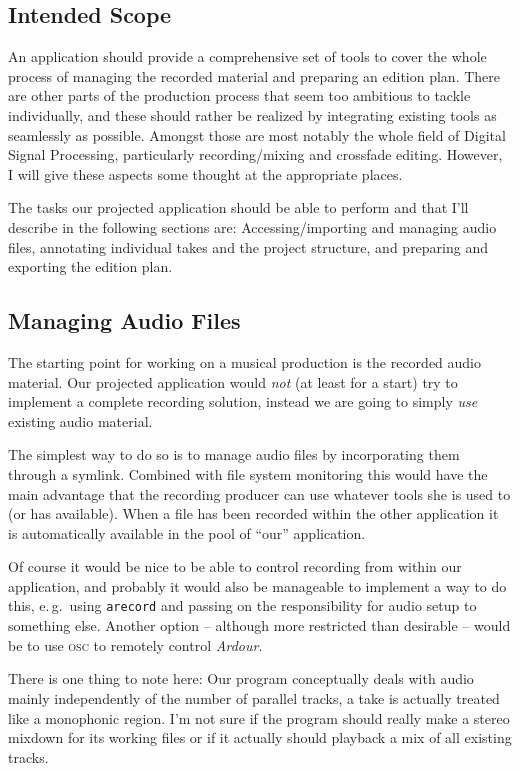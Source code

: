 \documentclass[11pt,a4paper]{article}
\begin{document}
\subsection{Intended Scope}

An application should provide a comprehensive set of tools to cover the whole
process of managing the recorded material and preparing an edition plan.
There are other parts of the production process that seem too ambitious to
tackle individually, and these should rather be realized by integrating existing
tools as seamlessly as possible.
Amongst those are most notably the whole field of Digital Signal Processing,
particularly recording/mixing and crossfade editing.
However, I will give these aspects some thought at the appropriate places.

The tasks our projected application should be able to perform and that I'll
describe in the following sections are:
Accessing/importing and managing audio files,
annotating individual takes and the project structure, and
preparing and exporting the edition plan.

\subsection{Managing Audio Files}

The starting point for working on a musical production is the recorded audio
material.
Our projected application would \emph{not} (at least for a start) try to
implement a complete recording solution, instead we are going to simply
\emph{use} existing audio material.

The simplest way to do so is to manage audio files by incorporating them through
a symlink.
Combined with file system monitoring this would have the main advantage that the
recording producer can use whatever tools she is used to (or has available).
When a file has been recorded within the other application it is automatically
available in the pool of “our” application.

Of course it would be nice to be able to control recording from within our
application, and probably it would also be manageable to implement a way to do
this, e.\,g.\ using \texttt{arecord} and passing on the responsibility for audio
setup to something else.
Another option -- although more restricted than desirable -- would be to use
\textsc{osc} to remotely control \emph{Ardour}.

There is one thing to note here: Our program conceptually deals with audio
mainly independently of the number of parallel tracks, a take is actually treated like
a monophonic region.
I'm not sure if the program should really make a stereo mixdown for its working
files or if it actually should playback a mix of all existing tracks.
\end{document}
